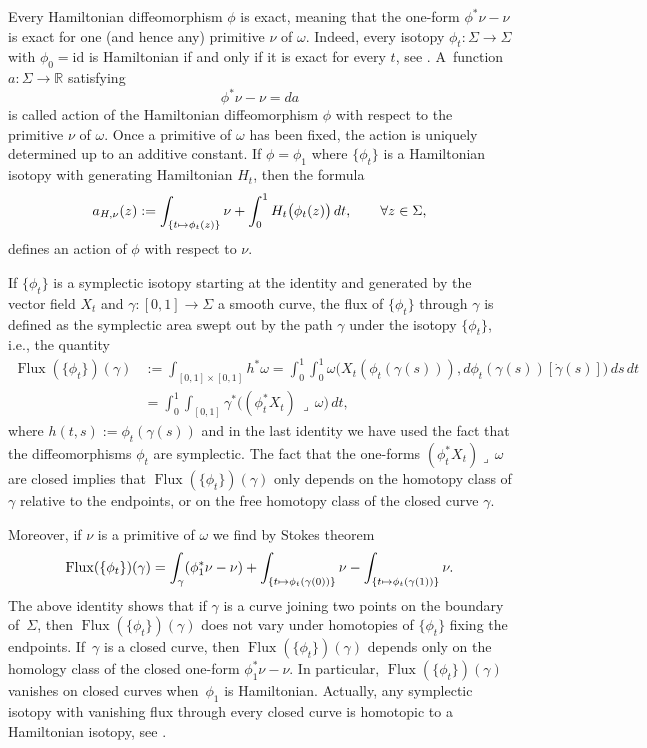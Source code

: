 \documentclass[11pt]{article}
\newcommand{\ie}{i.e.,\xspace}
\numberwithin{equation}{section}
\let\mathds\mathbb
\newcommand\mto{\mathchoice{\longmapsto}{\mapsto}{\mapsto}{\mapsto}}
\theoremstyle{definition}
\DeclareMathOperator{\Flux}{\mathrm{Flux}}
\newcommand{\R}{\mathds{R}}
\begin{document}
Every Hamiltonian diffeomorphism $\phi$ is exact, meaning that the one-form $\phi^* \nu - \nu$ is exact for one (and hence any) primitive $\nu$ of $\omega$. Indeed, every isotopy $\phi_t: \Sigma \to \Sigma$ with $\phi_0=\mathrm{id}$ is Hamiltonian if and only if it is exact for every $t$, see \cite[Prop.\,9.3.1]{McDuff:1998uu}. A~function $a: \Sigma \to \R$ satisfying
\[
\phi^* \nu - \nu = da
\]
is called action of the Hamiltonian diffeomorphism $\phi$ with respect to the primitive $\nu$ of $\omega$. Once a primitive of $\omega$ has been fixed, the action is uniquely determined up to an additive constant. If $\phi=\phi_1$ where $\{\phi_t\}$ is a Hamiltonian isotopy with generating Hamiltonian $H_t$, then the formula
\begin{equation}
\label{canaction}
a_{H,\nu}(z) := \int_{\{t\mto \phi_t(z)\}} \nu + \int_0^1 H_t \bigl(\phi_t(z)\bigr)\, dt, \qquad \forall z\in \Sigma,
\end{equation}
defines an action of $\phi$ with respect to $\nu$.

If $\{\phi_t\}$ is a symplectic isotopy starting at the identity and generated by the vector field $X_t$ and $\gamma: [0,1] \to \Sigma$ a smooth curve, the flux of $\{\phi_t\}$ through $\gamma$ is defined as the symplectic area swept out by the path $\gamma$ under the isotopy $\{\phi_t\}$, \ie the quantity
\[
\begin{split}
\Flux(\{\phi_t\})(\gamma) &:= \int_{[0,1]\times [0,1]} h^* \omega = \int_0^1 \int_0^1 \omega\bigl(X_t(\phi_t(\gamma(s))),d\phi_t(\gamma(s)) [ \dot{\gamma}(s) ] \bigr)\, ds \, dt \\ &= \int_0^1 \int_{[0,1]} \gamma^* \bigl( (\phi_t^* X_t) \,\lrcorner\, \omega \bigr)\, dt,
\end{split}
\]
where $h(t,s) := \phi_t(\gamma(s))$ and in the last identity we have used the fact that the diffeomorphisms $\phi_t$ are symplectic. The fact that the one-forms $(\phi_t^*X_t)\lrcorner\,\omega$ are closed implies that $\Flux(\{\phi_t\})(\gamma)$ only depends on the homotopy class of $\gamma$ relative to the endpoints, or on the free homotopy class of the closed curve $\gamma$.

Moreover, if $\nu$ is a primitive of $\omega$ we find by Stokes theorem
\[
\Flux(\{\phi_t\})(\gamma) = \int_{\gamma} (\phi_1^* \nu-\nu) + \int_{\{t \mto \phi_t(\gamma(0))\}} \nu - \int_{\{t \mto \phi_t(\gamma(1))\}} \nu.
\]
The above identity shows that if $\gamma$ is a curve joining two points on the boundary of~$\Sigma$, then $\Flux(\{\phi_t\})(\gamma)$ does not vary under homotopies of $\{\phi_t\}$ fixing the endpoints. If~$\gamma$ is a closed curve, then $\Flux(\{\phi_t\})(\gamma)$ depends only on the homology class of the closed one-form $\phi_1^* \nu - \nu$. In particular, $\Flux(\{\phi_t\})(\gamma)$ vanishes on closed curves when~$\phi_1$ is Hamiltonian. Actually, any symplectic isotopy with vanishing flux through every closed curve is homotopic to a Hamiltonian isotopy, see \cite[Th.\,10.2.5]{McDuff:1998uu}.
\end{document}
